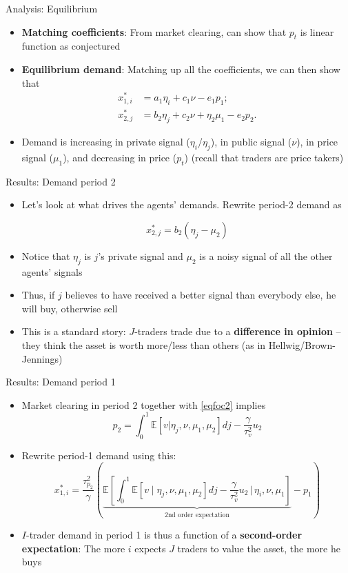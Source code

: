 \documentclass[english,10pt
,aspectratio=169
]{beamer}
\begin{document}
\begin{frame}{Analysis: Equilibrium}
	\begin{itemize}
		\item \textbf{Matching coefficients}: From market clearing, can show that $p_t$ is linear function as conjectured
		\item \textbf{Equilibrium demand}: Matching up all the coefficients, we can then show that
		\begin{align}
		x^*_{1,i} &=  a_1 \eta_i+c_1 \nu -e_1 p_1; \label{eqdem1} \\
		x^*_{2,j} &= b_2 \eta_j+c_2 \nu + \eta_2\mu_1-e_2 p_2. \label{eqdem2}
		\end{align} 
		\item Demand is increasing in private signal ($\eta_i$/$\eta_j$), in public signal ($\nu$), in price signal ($\mu_1$), and decreasing in price ($p_t$) 
		(recall that traders are price takers)
	\end{itemize}
\end{frame}


\begin{frame}{Results: Demand period 2}
	\begin{itemize}
		\item Let's look at what drives the agents' demands. Rewrite period-2 demand as 
		\begin{block}{}
			\begin{equation} \label{eqdem2z}
			x^*_{2,j} = b_2 (\eta_j - \mu_2) 
			\end{equation}
		\end{block}
		\item Notice that $\eta_j$ is $j$'s private signal and  $\mu_2$ is a noisy signal of all the other agents' signals
		\item Thus, if $j$ believes to have received a better signal than everybody else, he will buy, otherwise sell
		\item This is a standard story: $J$-traders trade due to a \textbf{difference in opinion} -- they think the asset is worth more/less than others (as in Hellwig/Brown-Jennings)
	\end{itemize}
\end{frame}


\begin{frame}{Results: Demand period 1}
	\begin{itemize}
		\item Market clearing in period 2 together with \eqref{eqfoc2} implies
		\[
		p_2 = \int_0^1 \mathbb{E}[v|\eta_j, \nu , \mu_1, \mu_2] dj - \frac{\gamma}{\tau^2_v}u_2
		\]
		\item Rewrite period-1 demand using this:
		\[
			x^*_{1,i} = \frac{\tau^2_{p_2}}{\gamma} \left( \underbrace{\mathbb{E}\left[ \int_0^1 \mathbb{E}[v \mid \eta_j, \nu , \mu_1, \mu_2 ] dj -\frac{\gamma}{\tau^2_v}u_2 \,\bigg|\, \eta_i,\nu,\mu_1 \right]}_{\text{2nd order expectation}}-p_1 \right)
		\]
		\item $I$-trader demand in period 1 is thus a function of a \textbf{second-order expectation}: 
		The more $i$ expects $J$ traders to value the asset, the more he buys 
	\end{itemize}
\end{frame}
\end{document}
